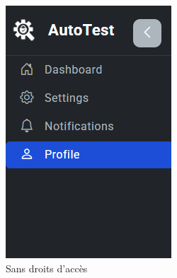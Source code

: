 \begin{justify}
\begin{enumerate}[label=\Alph*.]
\begin{figure}[H]
\begin{subfigure}[b]{0.32\linewidth}
                        \centering
                        \includegraphics[width=0.9\linewidth]{chapitres/ch3Sp1/section/sprint1/img/interface/0-permission-sidebar.PNG}
                        \caption{Sans droits d'accès}
                    \end{subfigure}
                    \hfill
                    \begin{subfigure}[b]{0.32\linewidth}
                        \centering

\end{subfigure}
\end{figure}
\end{enumerate}
\end{justify}
